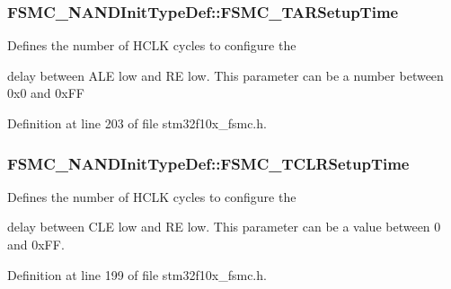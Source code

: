 \hypertarget{struct_f_s_m_c___n_a_n_d_init_type_def_a014c1b8977b454ac15654d93dbb7dff9}{
\subsubsection[{F\-S\-M\-C\-\_\-\-T\-A\-R\-Setup\-Time}]{ F\-S\-M\-C\-\_\-\-N\-A\-N\-D\-Init\-Type\-Def\-::\-F\-S\-M\-C\-\_\-\-T\-A\-R\-Setup\-Time}}\label{struct_f_s_m_c___n_a_n_d_init_type_def_a014c1b8977b454ac15654d93dbb7dff9}
\begin{DoxyVerb}     Defines the number of HCLK cycles to configure the
\end{DoxyVerb}
 delay between A\-L\-E low and R\-E low. This parameter can be a number between 0x0 and 0x\-F\-F 

Definition at line 203 of file stm32f10x\-\_\-fsmc.\-h.

\hypertarget{struct_f_s_m_c___n_a_n_d_init_type_def_a633c7be46a1d281916b9f2e34fa3d36a}{
\subsubsection[{F\-S\-M\-C\-\_\-\-T\-C\-L\-R\-Setup\-Time}]{ F\-S\-M\-C\-\_\-\-N\-A\-N\-D\-Init\-Type\-Def\-::\-F\-S\-M\-C\-\_\-\-T\-C\-L\-R\-Setup\-Time}}\label{struct_f_s_m_c___n_a_n_d_init_type_def_a633c7be46a1d281916b9f2e34fa3d36a}
\begin{DoxyVerb}    Defines the number of HCLK cycles to configure the
\end{DoxyVerb}
 delay between C\-L\-E low and R\-E low. This parameter can be a value between 0 and 0x\-F\-F. 

Definition at line 199 of file stm32f10x\-\_\-fsmc.\-h.

